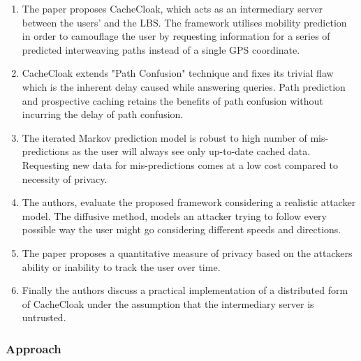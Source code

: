 \begin{enumerate}
	\item The paper proposes CacheCloak, which acts as an intermediary server 
	between the users' and the LBS. The framework utilises mobility prediction in
	order to camouflage the user by requesting information for a series of 
	predicted interweaving paths instead of a single GPS coordinate. 
	
	\item CacheCloak extends "Path Confusion" technique and fixes its trivial 
	flaw which is the inherent delay caused while answering queries. Path 
	prediction and prospective caching retains the benefits of path confusion 
	without incurring the delay of path confusion. 
	
	\item The iterated Markov prediction model is robust to high number of 
	mis-predictions as the user will always see only up-to-date cached data. 
	Requesting new data for mis-predictions comes at a low cost compared to 
	necessity of privacy. 
	
	\item The authors, evaluate the proposed framework considering a realistic
	attacker model. The diffusive method, models an attacker trying to follow
	every possible way the user might go considering different speeds and 
	directions. 
	
	\item The paper proposes a quantitative measure of privacy based on 
	the attackers ability or inability to track the user over time. 
	
	\item Finally the authors discuss a practical implementation of a distributed
	form of CacheCloak under the assumption that the intermediary server is 
	untrusted. 
	
\end{enumerate}

\subsubsection*{Approach}

